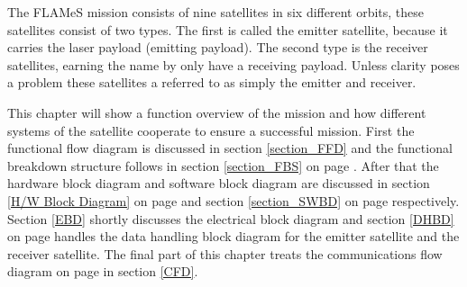 \label{MissionApproachIntro}

The \ac{FLAMeS} mission consists of nine satellites in six different orbits, these satellites consist of two types. The first is called the emitter satellite, because it carries the laser payload (emitting payload). The second type is the receiver satellites, earning the name by only have a receiving payload. Unless clarity poses a problem these satellites a referred to as simply the emitter and receiver.

This chapter will show a function overview of the mission and how different systems of the satellite cooperate to ensure a successful mission. First the functional flow diagram is discussed in section \ref{section_FFD} and the functional breakdown structure follows in section \ref{section_FBS} on page \pageref{section_FBS}. After that the hardware block diagram and software block diagram are discussed in section \ref{H/W Block Diagram} on page \pageref{H/W Block Diagram} and section \ref{section_SWBD} on page \pageref{section_SWBD} respectively. Section \ref{EBD} shortly discusses the electrical block diagram and section \ref{DHBD} on page \pageref{DHBD} handles the data handling block diagram for the emitter satellite and the receiver satellite. The final part of this chapter treats the communications flow diagram on page \pageref{CFD} in section \ref{CFD}.